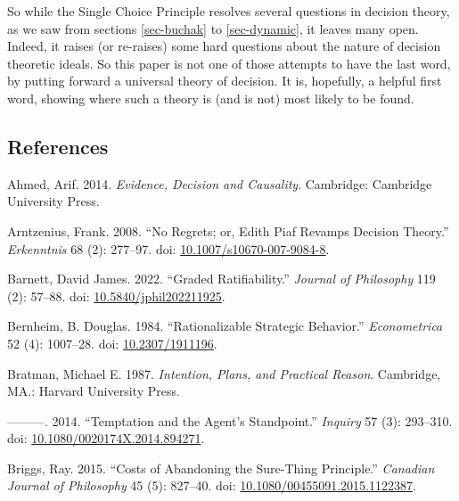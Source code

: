 \documentclass[
  10pt,
  letterpaper,
  DIV=11,
  numbers=noendperiod,
  twoside]{scrartcl}
\newlength{\cslhangindent}
\newenvironment{CSLReferences}[2] %
 {\begin{list}{}{%
  \setlength{\itemindent}{0pt}
  \setlength{\leftmargin}{0pt}
  \setlength{\parsep}{0pt}
  \ifodd #1
   \setlength{\leftmargin}{\cslhangindent}
   \setlength{\itemindent}{-1\cslhangindent}
  \fi
  \setlength{\itemsep}{#2\baselineskip}}}
 {\end{list}}
\begin{document}
So while the Single Choice Principle resolves several questions in
decision theory, as we saw from sections \ref{sec-buchak} to
\ref{sec-dynamic}, it leaves many open. Indeed, it raises (or re-raises)
some hard questions about the nature of decision theoretic ideals. So
this paper is not one of those attempts to have the last word, by
putting forward a universal theory of decision. It is, hopefully, a
helpful first word, showing where such a theory is (and is not) most
likely to be found.

\subsection*{References}\label{references}

\label{refs}
\begin{CSLReferences}{1}{0}
Ahmed, Arif. 2014. \emph{Evidence, Decision and Causality}. Cambridge:
{C}ambridge {U}niversity {P}ress.

Arntzenius, Frank. 2008. {``No Regrets; or, Edith Piaf Revamps Decision
Theory.''} \emph{Erkenntnis} 68 (2): 277--97. doi:
\href{https://doi.org/10.1007/s10670-007-9084-8}{10.1007/s10670-007-9084-8}.

Barnett, David James. 2022. {``Graded Ratifiability.''} \emph{Journal of
Philosophy} 119 (2): 57--88. doi:
\href{https://doi.org/10.5840/jphil202211925}{10.5840/jphil202211925}.

Bernheim, B. Douglas. 1984. {``Rationalizable Strategic Behavior.''}
\emph{Econometrica} 52 (4): 1007--28. doi:
\href{https://doi.org/10.2307/1911196}{10.2307/1911196}.

Bratman, Michael E. 1987. \emph{Intention, Plans, and Practical Reason}.
Cambridge, MA.: Harvard University Press.

---------. 2014. {``Temptation and the Agent's Standpoint.''}
\emph{Inquiry} 57 (3): 293--310. doi:
\href{https://doi.org/10.1080/0020174X.2014.894271}{10.1080/0020174X.2014.894271}.

Briggs, Ray. 2015. {``Costs of Abandoning the Sure-Thing Principle.''}
\emph{Canadian Journal of Philosophy} 45 (5): 827--40. doi:
\href{https://doi.org/10.1080/00455091.2015.1122387}{10.1080/00455091.2015.1122387}.


\end{CSLReferences}
\end{document}
